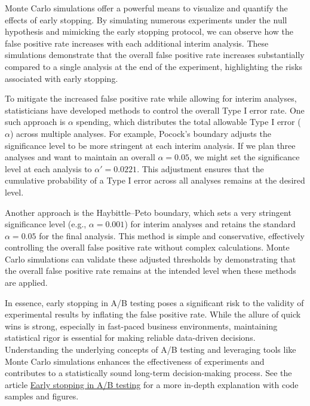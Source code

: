 \documentclass[final,5p,times,twocolumn,authoryear]{elsarticle}
\begin{document}
Monte Carlo simulations offer a powerful means to visualize and quantify the effects of early stopping. By simulating numerous experiments under the null hypothesis and mimicking the early stopping protocol, we can observe how the false positive rate increases with each additional interim analysis. These simulations demonstrate that the overall false positive rate increases substantially compared to a single analysis at the end of the experiment, highlighting the risks associated with early stopping.

To mitigate the increased false positive rate while allowing for interim analyses, statisticians have developed methods to control the overall Type I error rate. One such approach is $ \alpha $ spending, which distributes the total allowable Type I error ($ \alpha $) across multiple analyses. For example, Pocock's boundary adjusts the significance level to be more stringent at each interim analysis. If we plan three analyses and want to maintain an overall $ \alpha = 0.05 $, we might set the significance level at each analysis to $ \alpha' = 0.0221 $. This adjustment ensures that the cumulative probability of a Type I error across all analyses remains at the desired level.

Another approach is the Haybittle–Peto boundary, which sets a very stringent significance level (e.g., $ \alpha = 0.001 $) for interim analyses and retains the standard $ \alpha = 0.05 $ for the final analysis. This method is simple and conservative, effectively controlling the overall false positive rate without complex calculations. Monte Carlo simulations can validate these adjusted thresholds by demonstrating that the overall false positive rate remains at the intended level when these methods are applied.


In essence, early stopping in A/B testing poses a significant risk to the validity of experimental results by inflating the false positive rate. While the allure of quick wins is strong, especially in fast-paced business environments, maintaining statistical rigor is essential for making reliable data-driven decisions. Understanding the underlying concepts of A/B testing and leveraging tools like Monte Carlo simulations enhances the effectiveness of experiments and contributes to a statistically sound long-term decision-making process. See the article \href{https://bytepawn.com/early-stopping-in-ab-testing.html}{Early stopping in A/B testing} for a more in-depth explanation with code samples and figures.
\end{document}
